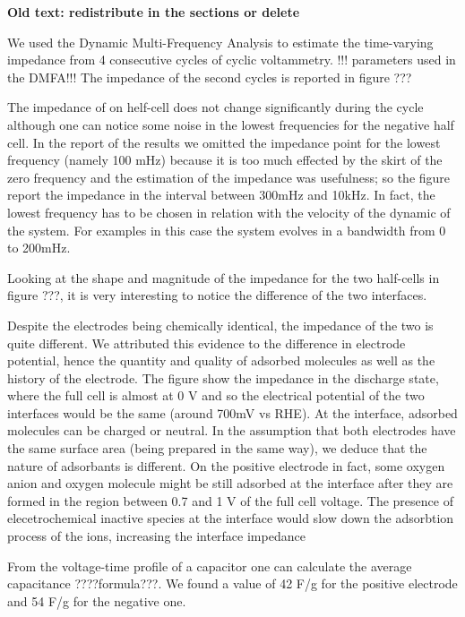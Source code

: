 \newpage
\textbf{Old text: redistribute in the sections or delete}

We used the Dynamic Multi-Frequency Analysis to estimate the time-varying impedance from 4 consecutive cycles of cyclic voltammetry. !!! parameters used in the DMFA!!! The impedance of the second cycles is reported in figure ???


The impedance of on helf-cell does not change significantly during the cycle although one can notice some noise in the lowest frequencies for the negative half cell. In the report of the results we omitted the impedance point for the lowest frequency (namely 100 mHz) because it is too much effected by the skirt of the zero frequency and the estimation of the impedance was usefulness; so the figure report the impedance in the interval between 300mHz and 10kHz. In fact, the lowest frequency has to be chosen in relation with the velocity of the dynamic of the system. For examples in this case the system evolves in a bandwidth from 0 to 200mHz. 

Looking at the shape and magnitude of the impedance for the two half-cells in figure ???, it is very interesting to notice the difference of the two interfaces.



Despite the electrodes being chemically identical, the impedance of the two is quite different. We attributed this evidence to the difference in electrode potential, hence the quantity and quality of adsorbed molecules as well as the history of the electrode. The figure show the impedance in the discharge state, where the full cell is almost at 0 V and so the electrical potential of the two interfaces would be the same (around 700mV vs RHE). At the interface, adsorbed molecules can be charged or neutral. In the assumption that both electrodes have the same surface area (being prepared in the same way), we deduce that the nature of adsorbants is different. On the positive electrode in fact, some oxygen anion and oxygen molecule might be still adsorbed at the interface after they are formed in the region between 0.7 and 1 V of the full cell voltage. The presence of elecetrochemical inactive species at the interface would slow down the adsorbtion process of the ions, increasing the interface impedance

From the voltage-time profile of a capacitor one can calculate the average capacitance ????formula???. We found a value of 42 F/g for the positive electrode and 54 F/g for the negative one.

